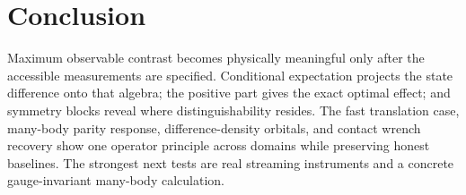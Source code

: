 \documentclass[letterpaper,journal]{IEEEtran}
\begin{document}
\section{Conclusion}

Maximum observable contrast becomes physically meaningful only after the
accessible measurements are specified. Conditional expectation projects the
state difference onto that algebra; the positive part gives the exact optimal
effect; and symmetry blocks reveal where distinguishability resides. The
fast translation case, many-body parity response, difference-density
orbitals, and contact wrench recovery show one operator principle across
domains while preserving honest baselines. The strongest next tests are
real streaming instruments and a concrete gauge-invariant many-body
calculation.



\end{document}
